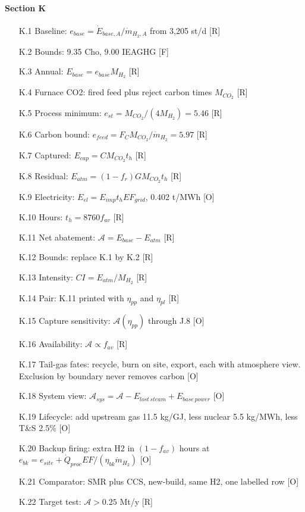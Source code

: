 \paragraph{Section K}
\begin{enumerate}[leftmargin=1.4cm,itemsep=0pt,topsep=2pt,parsep=0pt]\small
\item[K.1] Baseline: $e_{base}=\dot E_{base,A}/\dot m_{H_2,A}$ from 3,205 st/d {\footnotesize [R]}
\item[K.2] Bounds: 9.35 Cho, 9.00 IEAGHG {\footnotesize [F]}
\item[K.3] Annual: $E_{base}=e_{base}M_{H_2}$ {\footnotesize [R]}
\item[K.4] Furnace CO2: fired feed plus reject carbon times $M_{CO_2}$ {\footnotesize [R]}
\item[K.5] Process minimum: $e_{st}=M_{CO_2}/(4M_{H_2})=5.46$ {\footnotesize [R]}
\item[K.6] Carbon bound: $e_{feed}=F_CM_{CO_2}/\dot m_{H_2}=5.97$ {\footnotesize [R]}
\item[K.7] Captured: $E_{cap}=CM_{CO_2}t_h$ {\footnotesize [R]}
\item[K.8] Residual: $E_{atm}=(1-f_r)GM_{CO_2}t_h$ {\footnotesize [R]}
\item[K.9] Electricity: $E_{el}=E_{imp}t_hEF_{grid}$, 0.402 t/MWh {\footnotesize [O]}
\item[K.10] Hours: $t_h=8760f_{av}$ {\footnotesize [R]}
\item[K.11] Net abatement: $\mathcal A=E_{base}-E_{atm}$ {\footnotesize [R]}
\item[K.12] Bounds: replace K.1 by K.2 {\footnotesize [R]}
\item[K.13] Intensity: $CI=E_{atm}/M_{H_2}$ {\footnotesize [R]}
\item[K.14] Pair: K.11 printed with $\eta_{pp}$ and $\eta_{pl}$ {\footnotesize [R]}
\item[K.15] Capture sensitivity: $\mathcal A(\eta_{pp})$ through J.8 {\footnotesize [O]}
\item[K.16] Availability: $\mathcal A\propto f_{av}$ {\footnotesize [R]}
\item[K.17] Tail-gas fates: recycle, burn on site, export, each with atmosphere view. Exclusion by boundary never removes carbon {\footnotesize [O]}
\item[K.18] System view: $\mathcal A_{sys}=\mathcal A-E_{lost\,steam}+E_{base\,power}$ {\footnotesize [O]}
\item[K.19] Lifecycle: add upstream gas 11.5 kg/GJ, less nuclear 5.5 kg/MWh, less T\&S 2.5\% {\footnotesize [O]}
\item[K.20] Backup firing: extra H2 in $(1-f_{av})$ hours at $e_{bk}=e_{site}+\dot Q_{proc}EF/(\eta_{bk}\dot m_{H_2})$ {\footnotesize [O]}
\item[K.21] Comparator: SMR plus CCS, new-build, same H2, one labelled row {\footnotesize [O]}
\item[K.22] Target test: $\mathcal A>0.25$ Mt/y {\footnotesize [R]}
\end{enumerate}
